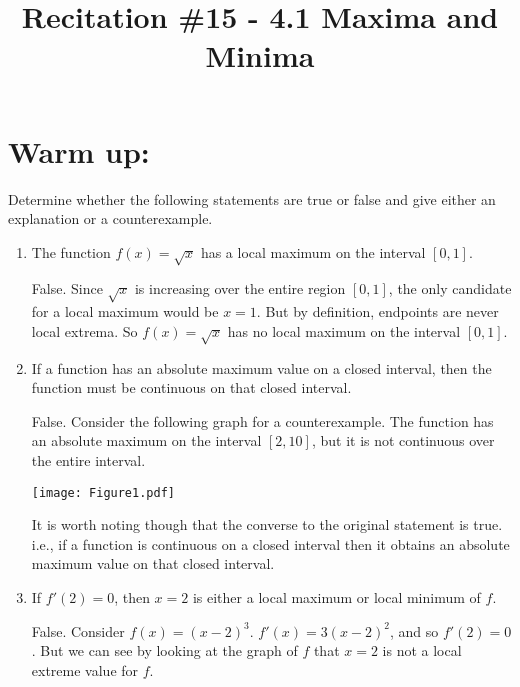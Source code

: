 \documentclass[handout,nooutcomes]{ximera}
\title{Recitation \#15 - 4.1 Maxima and Minima}
\begin{document}
\begin{abstract}		\end{abstract}
\maketitle

\section*{Warm up:} 
Determine whether the following statements are true or false and give either an explanation or a counterexample.

	\begin{enumerate}
	
	\item  The function $f(x) = \sqrt{x}$ has a local maximum on the interval $[0,1]$.
		\begin{freeResponse}
		False.  Since $\sqrt{x}$ is increasing over the entire region $[0,1]$, the only candidate for a local maximum would be $x=1$.  But by definition, endpoints are never local extrema.  So $f(x) = \sqrt{x}$ has no local maximum on the interval $[0,1]$.
		\end{freeResponse}	
		
		
		
	\item  If a function has an absolute maximum value on a closed interval, then the function must be continuous on that closed interval.  
		\begin{freeResponse}
		False.  Consider the following graph for a counterexample.  The function has an absolute maximum on the interval $[2,10]$, but it is not continuous over the entire interval.
		
		\begin{image}
		\texttt{[image: Figure1.pdf]}
		\end{image}
		
		It is worth noting though that the converse to the original statement is true.  i.e., if a function is continuous on a closed interval then it obtains an absolute maximum value on that closed interval.

		\end{freeResponse}	
		
		
		
	\item  If $f'(2)=0$, then $x=2$ is either a local maximum or local minimum of $f$.
		\begin{freeResponse}
		False.  Consider $f(x) = (x-2)^3$.  $f'(x) = 3(x-2)^2$, and so $f'(2) = 0$.  But we can see by looking at the graph of $f$ that $x=2$ is not a local extreme value for $f$.
		

\end{freeResponse}
\end{enumerate}
\end{document}
